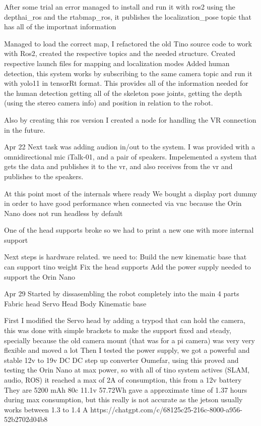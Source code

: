 After some trial an error managed to install and run it with ros2 using the depthai_ros and the rtabmap_ros, it publishes the localization_pose topic that has all of the importnat information

Managed to load the correct map, I refactored the old Tino source code to work with Ros2, created the respective topics and the needed structure. Created respective launch files for mapping and localization modes
Added human detection, this system works by subscribing to the same camera topic and run it with yolo11 in tensorRt format. This provides all of the information needed for the human detection getting all of the skeleton pose joints, getting the depth (using the stereo camera info) and position in relation to the robot.

Also by creating this ros version I created a node for handling the VR connection in the future. 

Apr 22
Next task was adding audion in/out to the system. I was provided with a omnidirectional mic iTalk-01, and a pair of speakers. Impelemented a system that gets the data and publishes it to the vr, and also receives from the vr and publishes to the speakers.

At this point most of the internals where ready
We bought a display port dummy in order to have good performance when connected via vnc because the Orin Nano does not run headless by default

One of the head supports broke so we had to print a new one with more internal support

Next steps is hardware related. we need to:
Build the new kinematic base that can support tino weight
Fix the head supports
Add the power supply needed to support the Orin Nano


Apr 29
Started by dissasembling the robot completely into the main 4 parts
Fabric head
Servo Head
Body
Kinematic base

First I modified the Servo head by adding a trypod that can hold the camera, this was done with simple brackets to make the support fixed and steady, specially because the old camera mount (that was for a pi camera) was very very flexible and moved a lot
Then I tested the power supply, we got a powerful and stable 12v to 19v DC DC step up converter Oumefar, using this proved and testing the Orin Nano at max power, so with all of tino system actives (SLAM, audio, ROS) it reached a max of 2A of consumption, this from a 12v battery They are 5200 mAh 80c 11.1v 57.72Wh gave a approximate time of 1.37 hours during max consumption, but this really is not accurate as the jetson usually works between 1.3 to 1.4 A
https://chatgpt.com/c/68125c25-216c-8000-a956-52b2702d04b8

